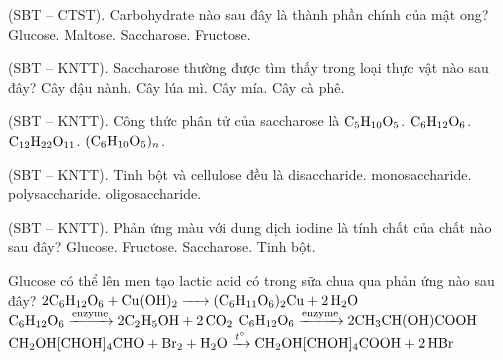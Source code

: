 \documentclass[12pt,a4paper]{article}
\begin{document}
\begin{ex}
(SBT -- CTST). Carbohydrate nào sau đây là thành phần chính của mật ong?
\choice
{Glucose.}
{Maltose.}
{Saccharose.}
{\True Fructose.}
\end{ex}

\begin{ex}
(SBT -- KNTT). Saccharose thường được tìm thấy trong loại thực vật nào sau đây?
\choice
{Cây đậu nành.}
{Cây lúa mì.}
{\True Cây mía.}
{Cây cà phê.}
\end{ex}

\begin{ex}
(SBT -- KNTT). Công thức phân tử của saccharose là
\choice
{$\ce{C5H10O5}$.}
{$\ce{C6H12O6}$.}
{\True $\ce{C12H22O11}$.}
{$(\ce{C6H10O5})_n$.}
\end{ex}

\begin{ex}
(SBT -- KNTT). Tinh bột và cellulose đều là
\choice
{disaccharide.}
{monosaccharide.}
{\True polysaccharide.}
{oligosaccharide.}
\end{ex}

\begin{ex}
(SBT -- KNTT). Phản ứng màu với dung dịch iodine là tính chất của chất nào sau đây?
\choice
{Glucose.}
{Fructose.}
{Saccharose.}
{\True Tinh bột.}
\end{ex}

\begin{ex}
Glucose có thể lên men tạo lactic acid có trong sữa chua qua phản ứng nào sau đây?
\choice
{$2\ce{C6H12O6 + Cu(OH)2 -> (C6H11O6)2Cu + 2H2O}$}
{$\ce{C6H12O6} \xrightarrow{\text{enzyme}} 2\ce{C2H5OH + 2CO2}$}
{\True $\ce{C6H12O6} \xrightarrow{\text{enzyme}} 2\ce{CH3CH(OH)COOH}$}
{$\ce{CH2OH[CHOH]4CHO + Br2 + H2O} \xrightarrow{t^\circ} \ce{CH2OH[CHOH]4COOH + 2HBr}$}
\end{ex}
\end{document}
